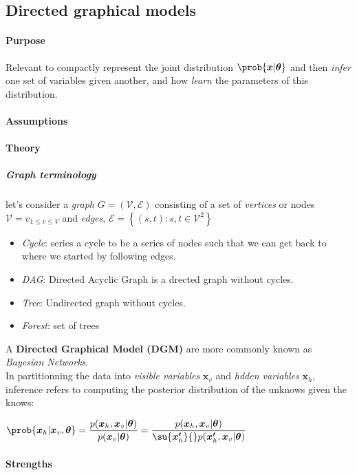 \subsection{Directed graphical models}
\paragraph{Purpose}
Relevant to compactly represent the joint distribution $\prob{\bm{x}|\bm{\theta}}$ and 
then \textit{infer} one set of variables given another, and how \textit{learn} the
parameters of this distribution.
\paragraph{Assumptions}
\paragraph{Theory}
\subparagraph{Graph terminology}
let's consider a \emph{graph} $G=(\mathcal{V}, \mathcal{E})$ consisting of a set of 
\emph{vertices} or nodes $\mathcal{V} = {v}_{1\leq v\leq V}$ and \emph{edges}, 
$\mathcal{E} = \left\{(s,t): s,t\in\mathcal{V}^{2}\right\}$
\begin{itemize}
    \item \emph{Cycle}: series a cycle to be a series of nodes such that we can get 
        back to where we started by following edges.
    \item \emph{DAG}: Directed Acyclic Graph is a drected graph without cycles.
    \item \emph{Tree}: Undirected graph without cycles.
    \item \emph{Forest}: set of trees
\end{itemize}
A \textbf{Directed Graphical Model (DGM)} are more commonly known as \emph{Bayesian 
Networks}.\\
In partitionning the data into \emph{visible variables} $\bm{x}_{v}$ and \emph{hdden
variables} $\bm{x}_{h}$, inference refers to computing the posterior distribution of 
the unknows given the knows:
\begin{center}
    $\prob{\bm{x}_{h}|\bm{x}_{v},\bm{\theta}} = \dfrac{p(\bm{x}_{h}, \bm{x}_{v}|
    \bm{\theta})}{p(\bm{x}_{v}|\bm{\theta})} = \dfrac{p(\bm{x}_{h}, \bm{x}_{v}|
\bm{\theta})}{\su{\bm{x'}_{h}}{}p(\bm{x'}_{h}, \bm{x}_{v}|\bm{\theta})}$
\end{center}


\paragraph{Strengths}
